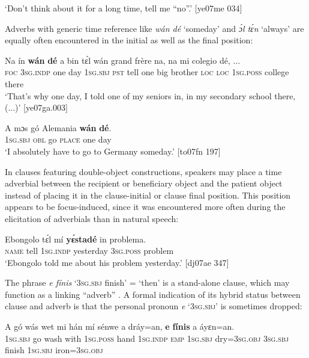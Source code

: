 \glt ‘Don’t think about it for a long time, tell me “no”.’ [ye07me 034]
\z

Adverbs with generic time reference like \textit{wán dé} ‘someday’ and \textit{ɔ́l tɛ́n} ‘always’ are equally often encountered in the initial as well as the final position: 


\ea%
    \label{ex:key:843}
    \gll Na  ín    \textbf{wán}    \textbf{dé}  a    bin  tɛ́l  wán    grand  frère     na, 
na  mi    colegio  dé,    \op...\cp{}\\
\textsc{foc}  \textsc{3sg.indp}  one    day  \textsc{1sg.sbj}  \textsc{pst}  tell  one    big     brother    \textsc{loc} 
\textsc{loc}  \textsc{1sg.poss}  college  there\\

\glt ‘That’s why one day, I told one of my seniors in, in my secondary school 
there, (...)’ [ye07ga.003]
\z


\ea%
    \label{ex:key:844}
    \gll \MakeUppercase{A}   mɔs    gó  Alemania  \textbf{wán}    \textbf{dé}.\\
\textsc{1sg.sbj}  \textsc{obl}    go  \textsc{place}    one    day\\

\glt ‘I absolutely have to go to Germany someday.’ [to07fn 197]
\z

In clauses featuring double-object constructions, speakers may place a time adverbial between the recipient or beneficiary object and the patient object instead of placing it in the clause-initial or clause final position. This position appears to be focus-induced, since it was encountered more often during the elicitation of adverbials than in natural speech:


\ea%
    \label{ex:key:845}
    \gll Ebongolo  tɛ́l  mí    \textbf{yɛ́stadé}    in    problema.\\
\textsc{name}    tell  \textsc{1sg.indp}  yesterday  \textsc{3sg.poss}  problem\\

\glt ‘Ebongolo told me about his problem yesterday.’ [dj07ae 347]
\z

The phrase \textit{e fínis} ‘\textsc{3sg.sbj} finish’ = ‘then’ is a stand-alone clause, which may function as a linking “adverb” . A formal indication of its hybrid status between clause and adverb is that the personal pronoun \textit{e} ‘\textsc{3sg.sbj}’ is sometimes dropped: 


\ea%
    \label{ex:key:846}
    \gll A    gó  wás    wet    mi    hán    mí    sénwe 
a    dráy=an,    \textbf{e}    \textbf{fínis}  a    áyɛn=an.\\ 
\textsc{1sg.sbj}  go  wash  with    \textsc{1sg.poss}  hand  \textsc{1sg.indp}  \textsc{emp} 
\textsc{1sg.sbj}  dry=\textsc{3sg.obj}  \textsc{3sg.sbj}  finish  \textsc{1sg.sbj}  iron=\textsc{3sg.obj}\\

